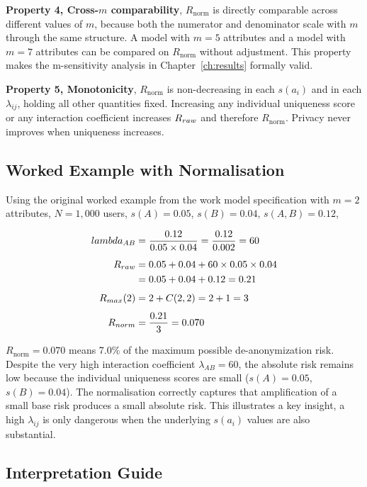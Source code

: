 \textbf{Property 4, Cross-$m$ comparability},
$R_{\mathrm{norm}}$ is directly comparable across
different values of $m$, because both the numerator
and denominator scale with $m$ through the same
structure. A model with $m = 5$ attributes and
a model with $m = 7$ attributes can be compared
on $R_{\mathrm{norm}}$ without adjustment. This
property makes the m-sensitivity analysis in
Chapter~\ref{ch:results} formally valid.

\textbf{Property 5, Monotonicity},
$R_{\mathrm{norm}}$ is non-decreasing in each
$s(a_i)$ and in each $\lambda_{ij}$, holding all
other quantities fixed. Increasing any individual
uniqueness score or any interaction coefficient
increases $R_{raw}$ and therefore $R_{\mathrm{norm}}$.
Privacy never improves when uniqueness increases.

\subsection{Worked Example with Normalisation}

Using the original worked example from the work
model specification with $m = 2$ attributes,
$N = 1{,}000$ users, $s(A) = 0.05$, $s(B) = 0.04$,
$s(A,B) = 0.12$,

\begin{align*}
lambda_{AB} &= \frac{0.12}{0.05 \times 0.04}
= \frac{0.12}{0.002} = 60 \\[4pt]
R_{raw} &= 0.05 + 0.04 + 60 \times 0.05 \times 0.04 \\
&= 0.05 + 0.04 + 0.12 = 0.21 \\[4pt]
R_{max}(2) &= 2 + C(2,2) = 2 + 1 = 3 \\[4pt]
R_{norm} &= \frac{0.21}{3} = 0.070
\end{align*}

$R_{\mathrm{norm}} = 0.070$ means 7.0\% of the maximum
possible de-anonymization risk. Despite the very high
interaction coefficient $\lambda_{AB} = 60$, the absolute
risk remains low because the individual uniqueness scores
are small ($s(A) = 0.05$, $s(B) = 0.04$). The
normalisation correctly captures that amplification of
a small base risk produces a small absolute risk.
This illustrates a key insight, a high $\lambda_{ij}$
is only dangerous when the underlying $s(a_i)$ values
are also substantial.

\subsection{Interpretation Guide}

